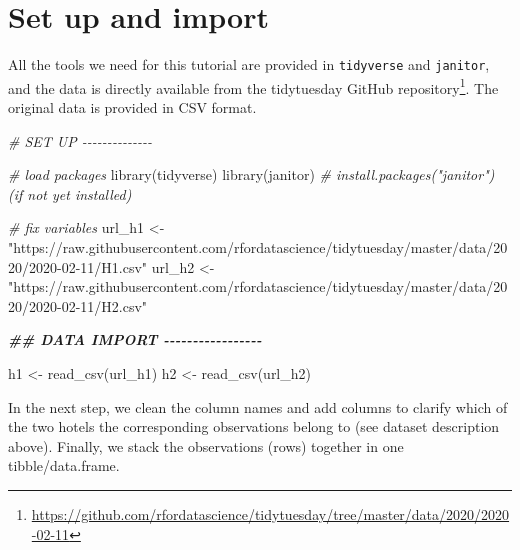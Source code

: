 \documentclass[
  12pt,
]{style/krantz}
\newenvironment{Shaded}{\begin{snugshade}}{\end{snugshade}}
\newcommand{\CommentTok}[1]{\textcolor[rgb]{0.56,0.35,0.01}{\textit{#1}}}
\newcommand{\DocumentationTok}[1]{\textcolor[rgb]{0.56,0.35,0.01}{\textbf{\textit{#1}}}}
\newcommand{\FunctionTok}[1]{\textcolor[rgb]{0.00,0.00,0.00}{#1}}
\newcommand{\NormalTok}[1]{#1}
\newcommand{\OtherTok}[1]{\textcolor[rgb]{0.56,0.35,0.01}{#1}}
\newcommand{\StringTok}[1]{\textcolor[rgb]{0.31,0.60,0.02}{#1}}
\renewcommand{\href}[2]{#2\footnote{\url{#1}}}
\begin{document}
\hypertarget{set-up-and-import}{%
\section{Set up and import}\label{set-up-and-import}}

All the tools we need for this tutorial are provided in \texttt{tidyverse} and \texttt{janitor}, and the data is directly available from the \href{https://github.com/rfordatascience/tidytuesday/tree/master/data/2020/2020-02-11}{tidytuesday GitHub repository}. The original data is provided in CSV format.

\begin{Shaded}
\begin{Highlighting}[]
\CommentTok{\# SET UP {-}{-}{-}{-}{-}{-}{-}{-}{-}{-}{-}{-}{-}{-}}

\CommentTok{\# load packages}
\FunctionTok{library}\NormalTok{(tidyverse)}
\FunctionTok{library}\NormalTok{(janitor) }\CommentTok{\# install.packages("janitor") (if not yet installed)}

\CommentTok{\# fix variables}
\NormalTok{url\_h1 }\OtherTok{\textless{}{-}} \StringTok{"https://raw.githubusercontent.com/rfordatascience/tidytuesday/master/data/2020/2020{-}02{-}11/H1.csv"}
\NormalTok{url\_h2 }\OtherTok{\textless{}{-}} \StringTok{"https://raw.githubusercontent.com/rfordatascience/tidytuesday/master/data/2020/2020{-}02{-}11/H2.csv"}

\DocumentationTok{\#\# DATA IMPORT {-}{-}{-}{-}{-}{-}{-}{-}{-}{-}{-}{-}{-}{-}{-}{-}{-}}

\NormalTok{h1 }\OtherTok{\textless{}{-}} \FunctionTok{read\_csv}\NormalTok{(url\_h1)}
\NormalTok{h2 }\OtherTok{\textless{}{-}} \FunctionTok{read\_csv}\NormalTok{(url\_h2)}
\end{Highlighting}
\end{Shaded}

In the next step, we clean the column names and add columns to clarify which of the two hotels the corresponding observations belong to (see dataset description above). Finally, we stack the observations (rows) together in one tibble/data.frame.
\end{document}
